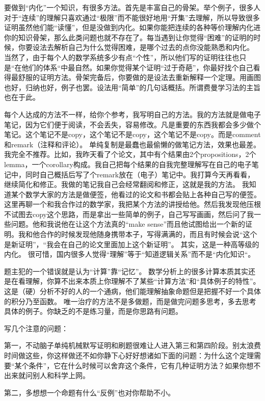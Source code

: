 \documentclass[12pt, a4paper, oneside]{ctexart}
\begin{document}
要做到“内化”一个知识，有很多方法。首先是丰富自己的骨架。举个例子，很多人对于“连续”的理解只喜欢通过“极限”而不能很好地用“开集”去理解，所以导致很多证明虽然他们能“读懂”，但是没做到内化。如果你能把连续的各种等价理解内化进你的知识骨架，那么此类问题也就不存在了。每当遇到让你觉得“困难”的证明的时候，你要设法去解析自己为什么觉得困难，是哪个过去的点你没能熟悉和内化。 当然了，由于每个人的数学系统多少有点“个性”，所以他们写的证明往往也只是“在他们的体系“中最自然。如果你觉得某个证明“过于奇葩”，你最好找个自己看得最舒服的证明方法。骨架完备后，你要做的是设法去重新解释一个定理。用画图也好，归纳也好，例子也罢。设法用“简单”的几句话概括。所谓费曼学习法的主旨也在于此。

每个人达成的方法不一样，给你个参考，我写明自己的方法。我的方法就是做电子笔记，因为它们便于阅读，不会丢失，容易修改。凡是重要的东西我都会多少做个笔记。这个笔记不是copy，这个笔记不是copy，这个笔记不是copy。而是comment 和remark（注释和评论）。 单纯复制是最蠢也最偷懒的做笔记方法，效果也最差。我完全不推荐。比如，我昨天看了个论文，其中有个结果由2个propositions，2个lemma，一个corollary构成。我自己把每个结果的自我完整理解写在自己的电子笔记中，同时自己概括后写了个remark放在（电子）笔记中。我打算今天再看看，继续简化和修正。我做的笔记我自己会经常翻阅和修正，这就是我的方法。 我知道某个数学大家的方法是做便签，他看过的论文和书都会贴上各种自己写的便签。这里再聊一个和我合作过的数学家，我把某个方法的讲授给他。然后我发现他压根不试图去copy这个思路，而是拿出一些简单的例子，自己写写画画，然后问了我一些问题。他和我说他在让这个方法真的“make sense”而且他试图给出一个新的证明。我和他合作的时候发现他随身携带本子，写得满满的，而且有时候会说“这个是新证明”，“我会在自己的论文里面加上这个新证明”。 其实，这是一种高等级的内化。 很可惜，国内很多人觉得“理解”等于“知道逻辑关系”而不是“内化知识“。

题主犯的一个错误就是认为“计算”靠“记忆”。 数学分析上的很多计算本质其实还是在看理解，你算不出来本质上你理解不了某些“计算方法”和“具体例子的特性”。这是（硬）分析不好的人的一个通病，他们能理解抽象命题但是把握不好一个具体的积分乃至函数。 唯一治疗的方法不是多做题，而是做完问题多思考，多去思考具体的例子。你缺乏的不是练习量，而是你思路有问题。

写几个注意的问题：

第一，不动脑子单纯机械默写证明和刷题很难让人进入第三和第四阶段。别太浪费时间做这些，你这样做还不如你静下心好好想诸如下面的问题：为什么这个定理需要“某个条件”，它在什么时候可以舍弃这个条件，它有几种证明方法？如果你想不出来就问别人和科学上网。

第二，多想想一个命题有什么“反例”也对你帮助不小。
\end{document}
